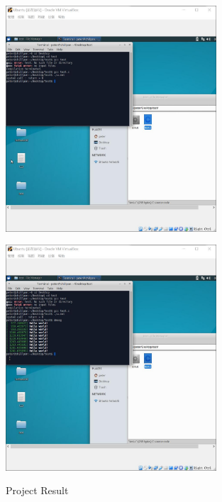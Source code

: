 \documentclass[12pt,a4paper]{article}
\begin{document}
\begin{minipage}{0.5\textwidth}
	\begin{figure}[H]
		\centering
		\includegraphics[width= 0.7\textwidth]{./fig/15_running.jpg}
	\end{figure}
\end{minipage}
\begin{minipage}{0.5\textwidth}
	\begin{figure}[H]
		\centering
		\includegraphics[width= 0.7\textwidth]{./fig/16_helloworld.jpg}
	\end{figure}
\end{minipage}
\begin{figure}[H]
	\centering
	\caption{Project Result}
\end{figure}
\end{document}
